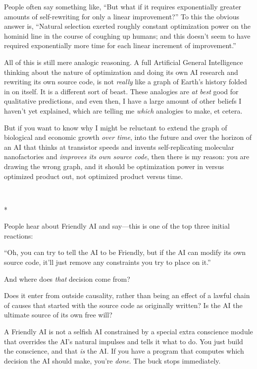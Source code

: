 {
 People often say something like, ``But what if it
requires exponentially greater amounts of self-rewriting for only a
linear improvement?'' To this the obvious answer is,
``Natural selection exerted roughly constant
optimization power on the hominid line in the course of coughing up
humans; and this doesn't seem to have required
exponentially more time for each linear increment of
improvement.''}

{
 All of this is still mere analogic reasoning. A full Artificial
General Intelligence thinking about the nature of optimization and
doing its own AI research and rewriting its own source code, is not
\textit{really} like a graph of Earth's history folded
in on itself. It is a different sort of beast. These analogies are
\textit{at best} good for qualitative predictions, and even then, I
have a large amount of other beliefs I haven't yet
explained, which are telling me \textit{which} analogies to make, et
cetera.}

{
 But if you want to know why I might be reluctant to extend the
graph of biological and economic growth \textit{over time}, into the
future and over the horizon of an AI that thinks at transistor speeds
and invents self-replicating molecular nanofactories and
\textit{improves its own source code}, then there is my reason: you are
drawing the wrong graph, and it should be optimization power in versus
optimized product out, not optimized product versus time.}

{\centering
 \ ~
\par}

{\centering
 *
\par}


{
 People hear about Friendly AI and say---this is one of the top
three initial reactions: }

{
 ``Oh, you can try to tell the AI to be Friendly,
but if the AI can modify its own source code, it'll
just remove any constraints you try to place on
it.''}

{
 And where does \textit{that} decision come from?}

{
 Does it enter from outside causality, rather than being an effect
of a lawful chain of causes that started with the source code as
originally written? Is the AI the ultimate source of its own free
will?}

{
 A Friendly AI is not a selfish AI constrained by a special extra
conscience module that overrides the AI's natural
impulses and tells it what to do. You just build the conscience, and
that \textit{is} the AI. If you have a program that computes which
decision the AI should make, you're \textit{done}. The
buck stops immediately.}

